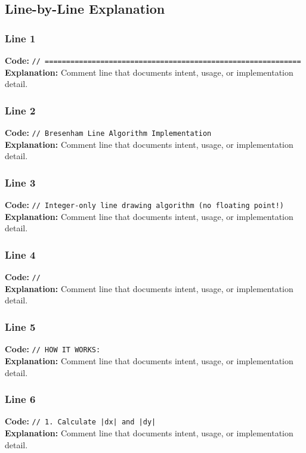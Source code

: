 \documentclass[11pt,a4paper]{article}
\begin{document}
\subsection{Line-by-Line Explanation}
\subsubsection*{Line 1}
\textbf{Code:} \verb|// ============================================================|\\
\textbf{Explanation:} Comment line that documents intent, usage, or implementation detail.

\subsubsection*{Line 2}
\textbf{Code:} \verb|// Bresenham Line Algorithm Implementation|\\
\textbf{Explanation:} Comment line that documents intent, usage, or implementation detail.

\subsubsection*{Line 3}
\textbf{Code:} \verb|// Integer-only line drawing algorithm (no floating point!)|\\
\textbf{Explanation:} Comment line that documents intent, usage, or implementation detail.

\subsubsection*{Line 4}
\textbf{Code:} \verb|//|\\
\textbf{Explanation:} Comment line that documents intent, usage, or implementation detail.

\subsubsection*{Line 5}
\textbf{Code:} \verb|// HOW IT WORKS:|\\
\textbf{Explanation:} Comment line that documents intent, usage, or implementation detail.

\subsubsection*{Line 6}
\textbf{Code:} \verb!// 1. Calculate |dx| and |dy|!\\
\textbf{Explanation:} Comment line that documents intent, usage, or implementation detail.
\end{document}
